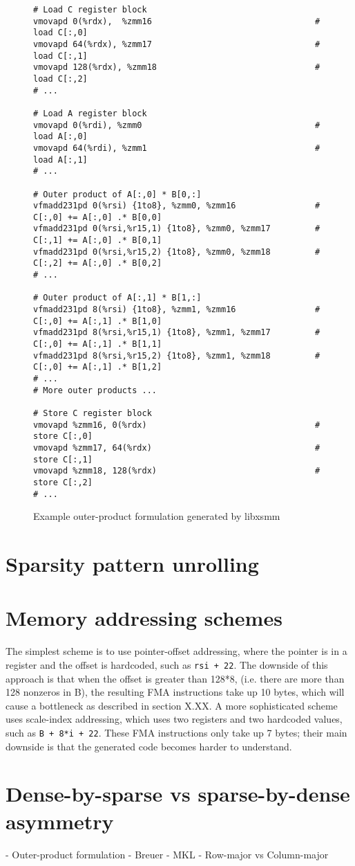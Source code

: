 \begin{figure}[ht]
\begin{verbatim}
# Load C register block
vmovapd 0(%rdx),  %zmm16                                 # load C[:,0]
vmovapd 64(%rdx), %zmm17                                 # load C[:,1]
vmovapd 128(%rdx), %zmm18                                # load C[:,2]
# ...

# Load A register block
vmovapd 0(%rdi), %zmm0                                   # load A[:,0]
vmovapd 64(%rdi), %zmm1                                  # load A[:,1]
# ...

# Outer product of A[:,0] * B[0,:]
vfmadd231pd 0(%rsi) {1to8}, %zmm0, %zmm16                # C[:,0] += A[:,0] .* B[0,0]
vfmadd231pd 0(%rsi,%r15,1) {1to8}, %zmm0, %zmm17         # C[:,1] += A[:,0] .* B[0,1]
vfmadd231pd 0(%rsi,%r15,2) {1to8}, %zmm0, %zmm18         # C[:,2] += A[:,0] .* B[0,2]
# ...

# Outer product of A[:,1] * B[1,:]
vfmadd231pd 8(%rsi) {1to8}, %zmm1, %zmm16                # C[:,0] += A[:,1] .* B[1,0]
vfmadd231pd 8(%rsi,%r15,1) {1to8}, %zmm1, %zmm17         # C[:,0] += A[:,1] .* B[1,1]
vfmadd231pd 8(%rsi,%r15,2) {1to8}, %zmm1, %zmm18         # C[:,0] += A[:,1] .* B[1,2]
# ...
# More outer products ...

# Store C register block
vmovapd %zmm16, 0(%rdx)                                  # store C[:,0]
vmovapd %zmm17, 64(%rdx)                                 # store C[:,1]
vmovapd %zmm18, 128(%rdx)                                # store C[:,2]
# ...
\end{verbatim}
\caption{Example outer-product formulation generated by libxsmm}
\label{fig:outerproduct}
\end{figure}

\section{Sparsity pattern unrolling}

\section{Memory addressing schemes}

The simplest scheme is to use pointer-offset addressing, where the pointer is in a register and the offset is hardcoded, such as \texttt{rsi + 22}. The downside of this approach is that when the offset is greater than 128*8, (i.e. there are more than 128 nonzeros in B), the resulting FMA instructions take up 10 bytes, which will cause a bottleneck as described in section X.XX. A more sophisticated scheme uses scale-index addressing, which uses two registers and two hardcoded values, such as \texttt{B + 8*i + 22}. These FMA instructions only take up 7 bytes; their main downside is that the generated code becomes harder to understand.




\section{Dense-by-sparse vs sparse-by-dense asymmetry}

- Outer-product formulation
- Breuer
- MKL
- Row-major vs Column-major

